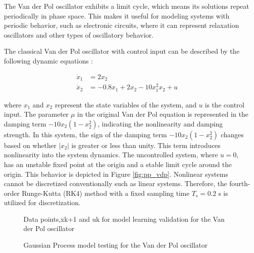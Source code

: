 The Van der Pol oscillator exhibits a limit cycle, which means its solutions repeat periodically in phase space. This makes it useful for modeling systems with periodic behavior, such as electronic circuits, where it can represent relaxation oscillators and other types of oscillatory behavior.


The classical Van der Pol oscillator with control input can be described by the following dynamic equations \cite{korda2020optimal}:

\begin{equation}\label{eq:vdp_states_equation}
    \begin{aligned}
        \dot{x}_1 &= 2x_2 \\
        \dot{x}_2 &= -0.8x_1 + 2x_2 - 10x_1^2x_2 + u
\end{aligned}
\end{equation}


where \( x_1 \) and \( x_2 \) represent the state variables of the system, and \( u \) is the control input. The parameter \( \mu \) in the original Van der Pol equation is represented in the damping term \( -10x_2(1 - x_2^2) \), indicating the nonlinearity and damping strength. In this system, the sign of the damping term \( -10x_2(1 - x_2^2) \) changes based on whether \( |x_2| \) is greater or less than unity. This term introduces nonlinearity into the system dynamics\cite{girotti_vanderpol_lecturenotes}. The uncontrolled system, where \( u = 0 \), has an unstable fixed point at the origin and a stable limit cycle around the origin. This behavior is depicted in Figure \ref{fig:pp_vdp}. Nonlinear systems cannot be discretized conventionally such as linear systems. Therefore, the fourth-order Runge-Kutta (RK4) method with a fixed sampling time $T_s = 0.2$ s is utilized for discretization. 

\begin{figure}
    \centering
    
    \caption{Data points,xk+1 and uk for model learning validation for the Van der Pol oscillator}
    \label{fig:data_test_vdp}
\end{figure}


\begin{figure}
    \centering
    
    \caption{Gaussian Process model testing for the Van der Pol oscillator}
    \label{fig:gp_test_vdp}
\end{figure}





